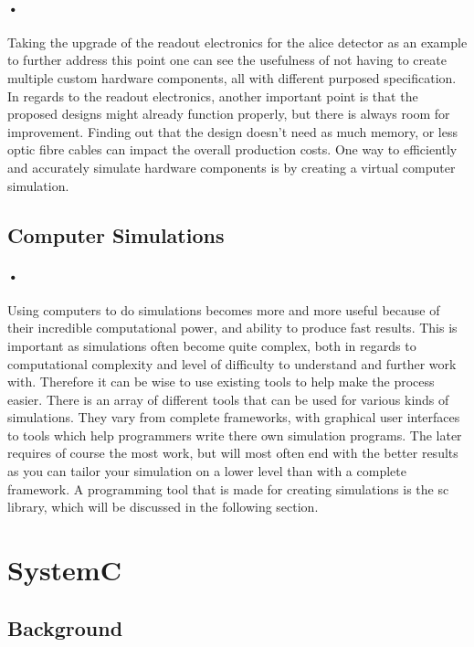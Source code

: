 \documentclass[a4paper, 12pt, openright, twoside]{report}
\begin{document}
\paragraph{•}
Taking the upgrade of the readout electronics for the \gls{alice} detector as an example to further address this point one can see the usefulness of not having to create multiple custom hardware components, all with different purposed specification.
In regards to the readout electronics, another important point is that the proposed designs might already function properly, but there is always room for improvement.
Finding out that the design doesn't need as much memory, or less optic fibre cables can impact the overall production costs.
One way to efficiently and accurately simulate hardware components is by creating a virtual computer simulation.

\subsection{Computer Simulations}
\paragraph{•}
Using computers to do simulations becomes more and more useful because of their incredible computational power, and ability to produce fast results.
This is important as simulations often become quite complex, both in regards to computational complexity and level of difficulty to understand and further work with.
Therefore it can be wise to use existing tools to help make the process easier.
There is an array of different tools that can be used for various kinds of simulations.
They vary from complete frameworks, with graphical user interfaces to tools which help programmers write there own simulation programs.
The later requires of course the most work, but will most often end with the better results as you can tailor your simulation on a lower level than with a complete framework.
A programming tool that is made for creating simulations is the \gls{sc} library, which will be discussed in the following section.

\section{SystemC}

\subsection{Background}
\end{document}
